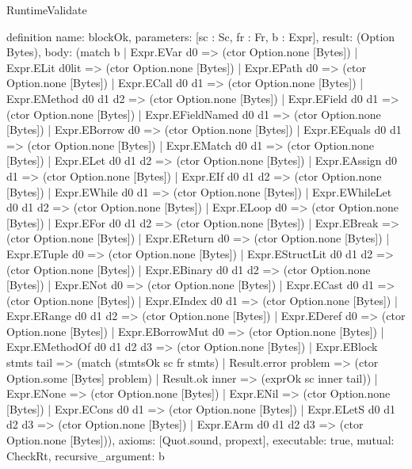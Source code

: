 \begin{lexlean}{RuntimeValidate}
\begin{semanticmodule}
definition{
  name: blockOk,
  parameters: [sc : Sc, fr : Fr, b : Expr],
  result: (Option Bytes),
  body: (match b
    | Expr.EVar d0 => (ctor Option.none [Bytes])
    | Expr.ELit d0lit => (ctor Option.none [Bytes])
    | Expr.EPath d0 => (ctor Option.none [Bytes])
    | Expr.ECall d0 d1 => (ctor Option.none [Bytes])
    | Expr.EMethod d0 d1 d2 => (ctor Option.none [Bytes])
    | Expr.EField d0 d1 => (ctor Option.none [Bytes])
    | Expr.EFieldNamed d0 d1 => (ctor Option.none [Bytes])
    | Expr.EBorrow d0 => (ctor Option.none [Bytes])
    | Expr.EEquals d0 d1 => (ctor Option.none [Bytes])
    | Expr.EMatch d0 d1 => (ctor Option.none [Bytes])
    | Expr.ELet d0 d1 d2 => (ctor Option.none [Bytes])
    | Expr.EAssign d0 d1 => (ctor Option.none [Bytes])
    | Expr.EIf d0 d1 d2 => (ctor Option.none [Bytes])
    | Expr.EWhile d0 d1 => (ctor Option.none [Bytes])
    | Expr.EWhileLet d0 d1 d2 => (ctor Option.none [Bytes])
    | Expr.ELoop d0 => (ctor Option.none [Bytes])
    | Expr.EFor d0 d1 d2 => (ctor Option.none [Bytes])
    | Expr.EBreak => (ctor Option.none [Bytes])
    | Expr.EReturn d0 => (ctor Option.none [Bytes])
    | Expr.ETuple d0 => (ctor Option.none [Bytes])
    | Expr.EStructLit d0 d1 d2 => (ctor Option.none [Bytes])
    | Expr.EBinary d0 d1 d2 => (ctor Option.none [Bytes])
    | Expr.ENot d0 => (ctor Option.none [Bytes])
    | Expr.ECast d0 d1 => (ctor Option.none [Bytes])
    | Expr.EIndex d0 d1 => (ctor Option.none [Bytes])
    | Expr.ERange d0 d1 d2 => (ctor Option.none [Bytes])
    | Expr.EDeref d0 => (ctor Option.none [Bytes])
    | Expr.EBorrowMut d0 => (ctor Option.none [Bytes])
    | Expr.EMethodOf d0 d1 d2 d3 => (ctor Option.none [Bytes])
    | Expr.EBlock stmts tail => (match (stmtsOk sc fr stmts)
      | Result.error problem => (ctor Option.some [Bytes] problem)
      | Result.ok inner => (exprOk sc inner tail))
    | Expr.ENone => (ctor Option.none [Bytes])
    | Expr.ENil => (ctor Option.none [Bytes])
    | Expr.ECons d0 d1 => (ctor Option.none [Bytes])
    | Expr.ELetS d0 d1 d2 d3 => (ctor Option.none [Bytes])
    | Expr.EArm d0 d1 d2 d3 => (ctor Option.none [Bytes])),
  axioms: [Quot.sound, propext],
  executable: true,
  mutual: CheckRt,
  recursive_argument: b
}


\end{semanticmodule}
\end{lexlean}
